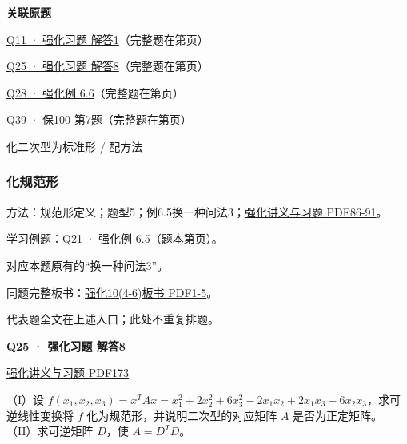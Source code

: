 \documentclass[UTF8,fontset=fandol,11pt,a4paper]{ctexart}
\newcommand{\source}[1]{{\footnotesize\color{Muted}#1\par}}
\newcommand{\qtitle}[2]{\par\needspace{5\baselineskip}\hypertarget{#1}{}\label{#1}\textbf{#2}\par}
\begin{document}
\textbf{关联原题}\par
\hyperlink{R-LONG-01}{Q11 · 强化习题 解答1}（完整题在第\pageref*{R-LONG-01}页）\par
\hyperlink{R-LONG-08}{Q25 · 强化习题 解答8}（完整题在第\pageref*{R-LONG-08}页）\par
\hyperlink{R-EX-06}{Q28 · 强化例 6.6}（完整题在第\pageref*{R-EX-06}页）\par
\hyperlink{S-07}{Q39 · 保100 第7题}（完整题在第\pageref*{S-07}页）\par
\clearpage
\source{化二次型为标准形 / 配方法}
\subsubsection*{化规范形}
\hypertarget{node-A2N}{}
方法：规范形定义；题型5；例6.5换一种问法3；\href{file:///Users/skyintelligence/Desktop/\%E5\%BE\%97\%E8\%AF\%BB\%E4\%B8\%AA\%E7\%A0\%94-\%E5\%8C\%97\%E5\%A4\%A7\%E8\%BD\%AF\%E5\%BE\%AE/\%E6\%95\%B0\%E5\%AD\%A6\%20150/Kira\%C2\%B727\%E7\%BA\%BF\%E6\%80\%A7\%E4\%BB\%A3\%E6\%95\%B0\%E5\%BC\%BA\%E5\%8C\%96\%E8\%AE\%B2\%E4\%B9\%89\%2B\%E4\%B9\%A0\%E9\%A2\%98.pdf\#page=86}{强化讲义与习题 PDF86-91}。\par
学习例题：\hyperlink{R-EX-05}{Q21 · 强化例 6.5}（题本第\pageref*{R-EX-05}页）。\par
\source{对应本题原有的“换一种问法3”。}
同题完整板书：\href{file:///Users/skyintelligence/Desktop/\%E5\%BE\%97\%E8\%AF\%BB\%E4\%B8\%AA\%E7\%A0\%94-\%E5\%8C\%97\%E5\%A4\%A7\%E8\%BD\%AF\%E5\%BE\%AE/\%E6\%95\%B0\%E5\%AD\%A6\%20150/\%E7\%BA\%BF\%E6\%80\%A7\%E4\%BB\%A3\%E6\%95\%B0/\%E7\%BA\%BF\%E4\%BB\%A3\%E5\%BC\%BA\%E5\%8C\%9610\%284-6\%29\%20\%20\%E7\%AC\%AC\%E5\%85\%AD\%E7\%AB\%A0\%20\%E4\%BA\%8C\%E6\%AC\%A1\%E5\%9E\%8B2\%E3\%80\%90\%E4\%BE\%8B6.5\%E3\%80\%91-\%E3\%80\%90\%E4\%BE\%8B6.13\%E3\%80\%91.pdf\#page=1}{强化10(4-6)板书 PDF1-5}。\par
\vspace{3mm}
\source{代表题全文在上述入口；此处不重复排题。}
\begin{minipage}{\linewidth}
\qtitle{R-LONG-08}{Q25 · 强化习题 解答8}
\source{\href{file:///Users/skyintelligence/Desktop/\%E5\%BE\%97\%E8\%AF\%BB\%E4\%B8\%AA\%E7\%A0\%94-\%E5\%8C\%97\%E5\%A4\%A7\%E8\%BD\%AF\%E5\%BE\%AE/\%E6\%95\%B0\%E5\%AD\%A6\%20150/Kira\%C2\%B727\%E7\%BA\%BF\%E6\%80\%A7\%E4\%BB\%A3\%E6\%95\%B0\%E5\%BC\%BA\%E5\%8C\%96\%E8\%AE\%B2\%E4\%B9\%89\%2B\%E4\%B9\%A0\%E9\%A2\%98.pdf\#page=173}{强化讲义与习题 PDF173}}
（I）设 $f(x_1,x_2,x_3)=x^TAx=x_1^2+2x_2^2+6x_3^2-2x_1x_2+2x_1x_3-6x_2x_3$，求可逆线性变换将 $f$ 化为规范形，并说明二次型的对应矩阵 $A$ 是否为正定矩阵。
（II）求可逆矩阵 $D$，使 $A=D^TD$。
\end{minipage}\par\vspace{7mm}
\end{document}
